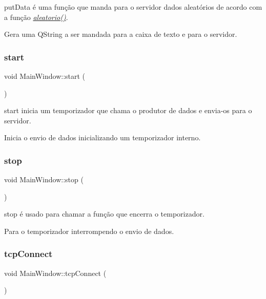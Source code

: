 put\+Data é uma função que manda para o servidor dados aleatórios de acordo com a função {\itshape \mbox{\hyperlink{class_main_window_ab29e2b2ee8118c9d36c45820309a9093}{aleatorio()}}}. 

Gera uma Q\+String a ser mandada para a caixa de texto e para o servidor. \mbox{\label{class_main_window_a5edcbc314e782645cdf4db101eeb247d}} 
\subsubsection{\texorpdfstring{start}{start}}
{\footnotesize\ttfamily void Main\+Window\+::start (\begin{DoxyParamCaption}{ }\end{DoxyParamCaption})\hspace{0.3cm}{\ttfamily [slot]}}



start inicia um temporizador que chama o produtor de dados e envia-\/os para o servidor. 

Inicia o envio de dados inicializando um temporizador interno. \mbox{\label{class_main_window_a939e90ddfe07d74be87b351ca2171fb0}} 
\subsubsection{\texorpdfstring{stop}{stop}}
{\footnotesize\ttfamily void Main\+Window\+::stop (\begin{DoxyParamCaption}{ }\end{DoxyParamCaption})\hspace{0.3cm}{\ttfamily [slot]}}



stop é usado para chamar a função que encerra o temporizador. 

Para o temporizador interrompendo o envio de dados. \mbox{\label{class_main_window_ac5b669957c442b6eb68573dacfce33e1}} 
\subsubsection{\texorpdfstring{tcp\+Connect}{tcpConnect}}
{\footnotesize\ttfamily void Main\+Window\+::tcp\+Connect (\begin{DoxyParamCaption}{ }\end{DoxyParamCaption})\hspace{0.3cm}{\ttfamily [slot]}}



